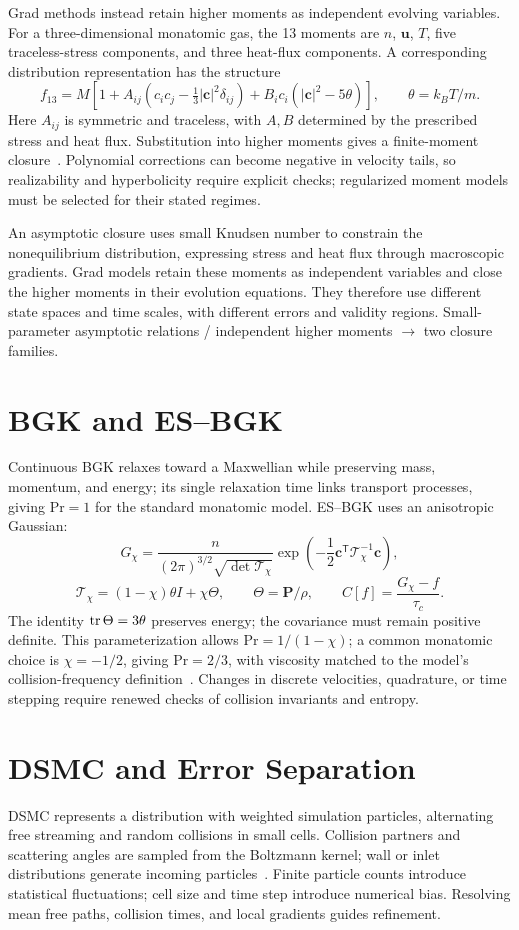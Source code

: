 Grad methods instead retain higher moments as independent evolving variables.
For a three-dimensional monatomic gas, the 13 moments are
$n$, $\bm u$, $T$, five traceless-stress components, and three heat-flux components.
A corresponding distribution representation has the structure
\[
f_{13}=M\left[1+
A_{ij}\left(c_ic_j-\tfrac13|\bm c|^2\delta_{ij}\right)
+B_i c_i(|\bm c|^2-5\theta)\right],
\qquad \theta=k_BT/m.
\]
Here $A_{ij}$ is symmetric and traceless, with $A,B$ determined by the prescribed stress and heat flux.
Substitution into higher moments gives a finite-moment closure~\cite{grad1949}.
Polynomial corrections can become negative in velocity tails, so realizability and hyperbolicity require explicit checks;
regularized moment models must be selected for their stated regimes.

{An asymptotic closure uses small Knudsen number to constrain the nonequilibrium distribution, expressing stress and heat flux through macroscopic gradients.
Grad models retain these moments as independent variables and close the higher moments in their evolution equations.
They therefore use different state spaces and time scales, with different errors and validity regions.}
{Small-parameter asymptotic relations / independent higher moments $\longrightarrow$ two closure families.}

\section{BGK and ES--BGK}
Continuous BGK relaxes toward a Maxwellian while preserving mass, momentum, and energy;
its single relaxation time links transport processes, giving $\mathrm{Pr}=1$ for the standard monatomic model.
ES--BGK uses an anisotropic Gaussian:
\[
G_\chi=\frac{n}{(2\pi)^{3/2}\sqrt{\det\mathcal T_\chi}}
\exp\left(-\frac12\bm c^{\mathsf T}\mathcal T_\chi^{-1}\bm c\right),
\]
\[
\mathcal T_\chi=(1-\chi)\theta I+\chi\Theta,\qquad
\Theta=\bm P/\rho,\qquad
C[f]=\frac{G_\chi-f}{\tau_c}.
\]
The identity $\operatorname{tr}\Theta=3\theta$ preserves energy; the covariance must remain positive definite.
This parameterization allows $\mathrm{Pr}=1/(1-\chi)$;
a common monatomic choice is $\chi=-1/2$, giving $\mathrm{Pr}=2/3$,
with viscosity matched to the model's collision-frequency definition~\cite{holway1966}.
Changes in discrete velocities, quadrature, or time stepping require renewed checks of collision invariants and entropy.

\section{DSMC and Error Separation}
DSMC represents a distribution with weighted simulation particles, alternating free streaming and random collisions in small cells.
Collision partners and scattering angles are sampled from the Boltzmann kernel;
wall or inlet distributions generate incoming particles~\cite{bird1994}.
Finite particle counts introduce statistical fluctuations; cell size and time step introduce numerical bias.
Resolving mean free paths, collision times, and local gradients guides refinement.

